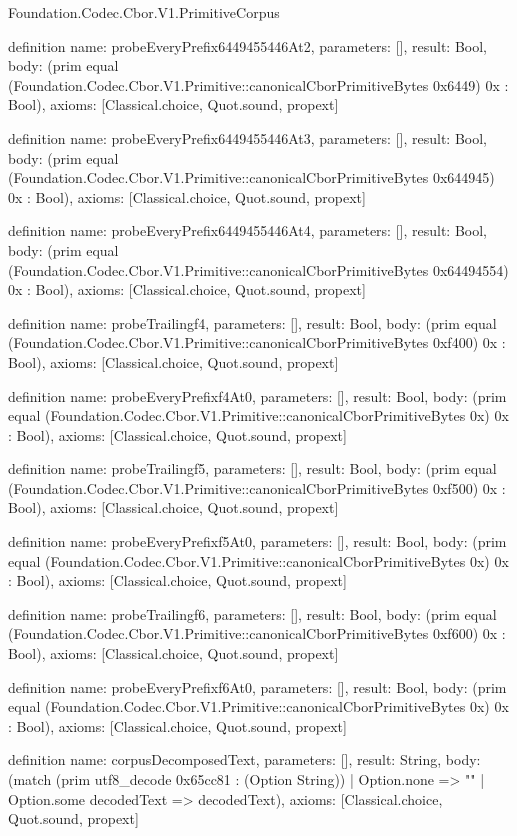 \begin{lexlean}{Foundation.Codec.Cbor.V1.PrimitiveCorpus}
\begin{semanticmodule}
definition{
  name: probeEveryPrefix6449455446At2,
  parameters: [],
  result: Bool,
  body: (prim equal (Foundation.Codec.Cbor.V1.Primitive::canonicalCborPrimitiveBytes 0x6449) 0x : Bool),
  axioms: [Classical.choice, Quot.sound, propext]
}

definition{
  name: probeEveryPrefix6449455446At3,
  parameters: [],
  result: Bool,
  body: (prim equal (Foundation.Codec.Cbor.V1.Primitive::canonicalCborPrimitiveBytes 0x644945) 0x : Bool),
  axioms: [Classical.choice, Quot.sound, propext]
}

definition{
  name: probeEveryPrefix6449455446At4,
  parameters: [],
  result: Bool,
  body: (prim equal (Foundation.Codec.Cbor.V1.Primitive::canonicalCborPrimitiveBytes 0x64494554) 0x : Bool),
  axioms: [Classical.choice, Quot.sound, propext]
}

definition{
  name: probeTrailingf4,
  parameters: [],
  result: Bool,
  body: (prim equal (Foundation.Codec.Cbor.V1.Primitive::canonicalCborPrimitiveBytes 0xf400) 0x : Bool),
  axioms: [Classical.choice, Quot.sound, propext]
}

definition{
  name: probeEveryPrefixf4At0,
  parameters: [],
  result: Bool,
  body: (prim equal (Foundation.Codec.Cbor.V1.Primitive::canonicalCborPrimitiveBytes 0x) 0x : Bool),
  axioms: [Classical.choice, Quot.sound, propext]
}

definition{
  name: probeTrailingf5,
  parameters: [],
  result: Bool,
  body: (prim equal (Foundation.Codec.Cbor.V1.Primitive::canonicalCborPrimitiveBytes 0xf500) 0x : Bool),
  axioms: [Classical.choice, Quot.sound, propext]
}

definition{
  name: probeEveryPrefixf5At0,
  parameters: [],
  result: Bool,
  body: (prim equal (Foundation.Codec.Cbor.V1.Primitive::canonicalCborPrimitiveBytes 0x) 0x : Bool),
  axioms: [Classical.choice, Quot.sound, propext]
}

definition{
  name: probeTrailingf6,
  parameters: [],
  result: Bool,
  body: (prim equal (Foundation.Codec.Cbor.V1.Primitive::canonicalCborPrimitiveBytes 0xf600) 0x : Bool),
  axioms: [Classical.choice, Quot.sound, propext]
}

definition{
  name: probeEveryPrefixf6At0,
  parameters: [],
  result: Bool,
  body: (prim equal (Foundation.Codec.Cbor.V1.Primitive::canonicalCborPrimitiveBytes 0x) 0x : Bool),
  axioms: [Classical.choice, Quot.sound, propext]
}

definition{
  name: corpusDecomposedText,
  parameters: [],
  result: String,
  body: (match (prim utf8_decode 0x65cc81 : (Option String))
    | Option.none => ""
    | Option.some decodedText => decodedText),
  axioms: [Classical.choice, Quot.sound, propext]
}


\end{semanticmodule}
\end{lexlean}
